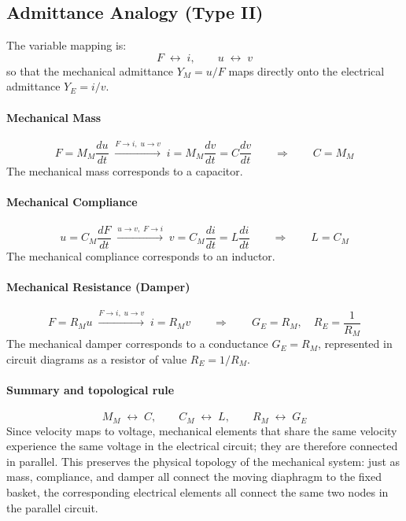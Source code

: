 \subsection{Admittance Analogy (Type II)}

The variable mapping is:
\[
F \;\leftrightarrow\; i, \qquad u \;\leftrightarrow\; v
\]
so that the mechanical admittance \(Y_M = u/F\) maps directly onto the electrical 
admittance \(Y_E = i/v\).

\paragraph{Mechanical Mass}
\[
F = M_M \frac{du}{dt}
\;\xrightarrow{F\to i,\;u\to v}\;
i = M_M \frac{dv}{dt} = C \frac{dv}{dt}
\qquad\Longrightarrow\qquad
C = M_M
\]
The mechanical mass corresponds to a capacitor.

\paragraph{Mechanical Compliance}
\[
u = C_M \frac{dF}{dt}
\;\xrightarrow{u\to v,\;F\to i}\;
v = C_M \frac{di}{dt} = L \frac{di}{dt}
\qquad\Longrightarrow\qquad
L = C_M
\]
The mechanical compliance corresponds to an inductor.

\paragraph{Mechanical Resistance (Damper)}
\[
F = R_M u
\;\xrightarrow{F\to i,\;u\to v}\;
i = R_M v
\qquad\Longrightarrow\qquad
G_E = R_M, \quad R_E = \frac{1}{R_M}
\]
The mechanical damper corresponds to a conductance \(G_E = R_M\), represented 
in circuit diagrams as a resistor of value \(R_E = 1/R_M\).

\paragraph{Summary and topological rule}
\[
M_M \;\leftrightarrow\; C, \qquad C_M \;\leftrightarrow\; L, 
\qquad R_M \;\leftrightarrow\; G_E
\]
Since velocity maps to voltage, mechanical elements that share the same velocity 
experience the same voltage in the electrical circuit; they are therefore connected 
in parallel. This preserves the physical topology of the mechanical system: 
just as mass, compliance, and damper all connect the moving diaphragm to the fixed 
basket, the corresponding electrical elements all connect the same two nodes in the 
parallel circuit.

